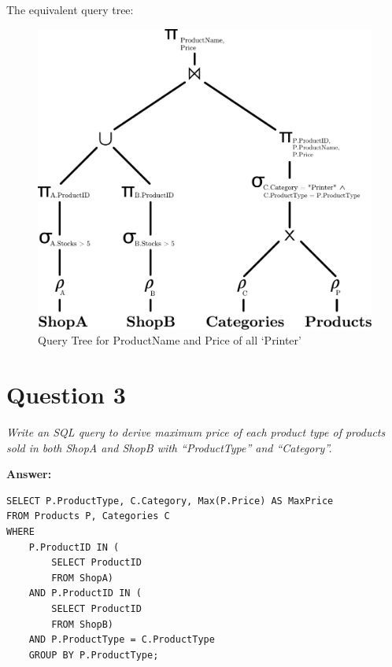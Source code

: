 \documentclass[a4paper,11pt]{article}
\begin{document}
\hline

\vspace{1em}
\noindent
The equivalent query tree:
\begin{figure}[htbp]
    \centering
    \includegraphics[scale=0.5]{ADE_A1_QueryTree.pdf}
    \caption{Query Tree for ProductName and Price of all `Printer'}
\end{figure}



\pagebreak

\section*{Question 3}

\textit{Write an SQL query to derive maximum price of each product type of products sold in both ShopA and ShopB with ``ProductType'' and ``Category''.} 

\noindent
\textbf{Answer:} \\[-3em]

\begin{lstlisting}[label={list:first},caption=SQL query to return maximum price for each categories.]
SELECT P.ProductType, C.Category, Max(P.Price) AS MaxPrice
FROM Products P, Categories C
WHERE 
    P.ProductID IN (
        SELECT ProductID
        FROM ShopA)
    AND P.ProductID IN (
        SELECT ProductID 
        FROM ShopB) 
    AND P.ProductType = C.ProductType
    GROUP BY P.ProductType;
\end{lstlisting}
\end{document}
